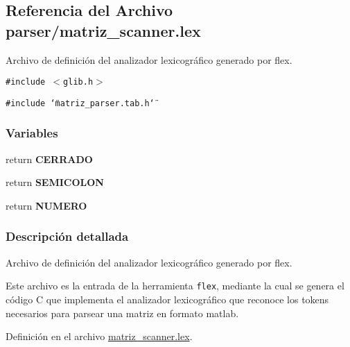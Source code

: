 \hypertarget{matriz__scanner_8lex}{
\subsection{Referencia del Archivo parser/matriz\_\-scanner.lex}
\label{matriz__scanner_8lex}
}
Archivo de definición del analizador lexicográfico generado por flex. 

{\tt \#include $<$glib.h$>$}\par
{\tt \#include \char`\"{}matriz\_\-parser.tab.h\char`\"{}}\par
\subsubsection*{Variables}
\begin{CompactItemize}
\item 
\hypertarget{matriz__scanner_8lex_d10e894a32bf3ddef716267dd9cdcd92}{
return \textbf{CERRADO}}
\label{matriz__scanner_8lex_d10e894a32bf3ddef716267dd9cdcd92}

\item 
\hypertarget{matriz__scanner_8lex_7d63ca0fbfedd9d1e009e96e63099513}{
return \textbf{SEMICOLON}}
\label{matriz__scanner_8lex_7d63ca0fbfedd9d1e009e96e63099513}

\item 
\hypertarget{matriz__scanner_8lex_3204cb935f502abe75f7b71380d48620}{
return \textbf{NUMERO}}
\label{matriz__scanner_8lex_3204cb935f502abe75f7b71380d48620}

\end{CompactItemize}


\subsubsection{Descripción detallada}
Archivo de definición del analizador lexicográfico generado por flex. 

Este archivo es la entrada de la herramienta {\tt flex}, mediante la cual se genera el código C que implementa el analizador lexicográfico que reconoce los tokens necesarios para parsear una matriz en formato matlab. 

Definición en el archivo \hyperlink{matriz__scanner_8lex-source}{matriz\_\-scanner.lex}.